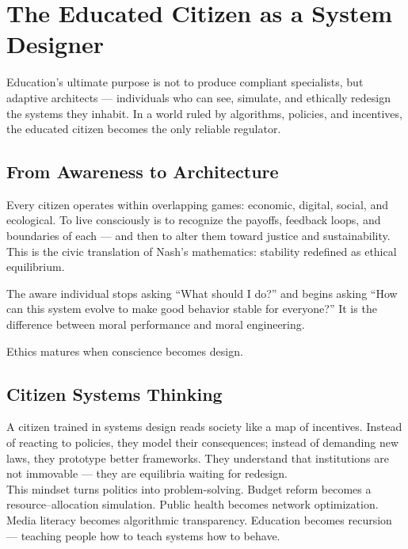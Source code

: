 \documentclass[12pt,twoside]{book}
\begin{document}
\section{The Educated Citizen as a System Designer}

Education’s ultimate purpose is not to produce compliant specialists, but adaptive architects — individuals who can see, simulate, and ethically redesign the systems they inhabit.  
In a world ruled by algorithms, policies, and incentives, the educated citizen becomes the only reliable regulator.

\subsection*{From Awareness to Architecture}

Every citizen operates within overlapping games: economic, digital, social, and ecological.  
To live consciously is to recognize the payoffs, feedback loops, and boundaries of each — and then to alter them toward justice and sustainability.  
This is the civic translation of Nash’s mathematics: stability redefined as ethical equilibrium.

The aware individual stops asking “What should I do?” and begins asking “How can this system evolve to make good behavior stable for everyone?”  
It is the difference between moral performance and moral engineering.\\

\begin{keyidea}
Ethics matures when conscience becomes design.
\end{keyidea}

\subsection*{Citizen Systems Thinking}

A citizen trained in systems design reads society like a map of incentives.  
Instead of reacting to policies, they model their consequences; instead of demanding new laws, they prototype better frameworks.  
They understand that institutions are not immovable — they are equilibria waiting for redesign. \\

This mindset turns politics into problem-solving.  
Budget reform becomes a resource–allocation simulation.  
Public health becomes network optimization.  
Media literacy becomes algorithmic transparency.  
Education becomes recursion — teaching people how to teach systems how to behave. \\
\end{document}
